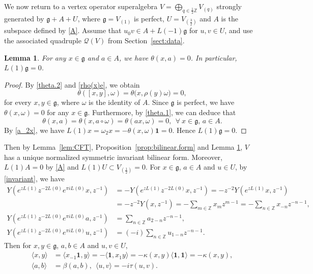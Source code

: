 \documentclass[12pt]{article}
\numberwithin{equation}{section}
\newtheorem{lemma}[theorem]{Lemma}
\theoremstyle{definition}
\theoremstyle{plain}
\newcommand{\bZ}{\ensuremath{\mathbb{Z}}}
\newcommand{\fg}{\mathfrak{g}}
\newcommand{\cQ}{\ensuremath{\mathcal{Q}}}
\newcommand{\bone}{\mathbf{1 }}
\begin{document}
We now return to a vertex operator superalgebra $V=\bigoplus_{q\in\frac{1}{2}\bZ}V_{(q)}$ strongly generated by $\fg+A+U$, where $\fg=V_{(1)}$ is perfect, $U=V_{(\frac32)}$ and $A$ is the subspace defined by \eqref{A}. Assume that $u_0v\in A+L(-1)\fg$ for $u,v\in U$, and use the associated quadruple $\cQ(V)$ from Section~\ref{sect:data}. 
\begin{lemma}\label{lem:L(1)g=0}
    For any $x\in\fg$ and $a\in A$, we have $\theta(x,a)=0$. In particular, $L(1)\fg=0$.
\end{lemma}
\begin{proof}
    By \eqref{theta.2} and \eqref{rho(x)e}, we obtain
    \begin{equation*}
        \theta([x,y],\omega)=\theta\big(x,\rho(y)\omega\big)=0,
    \end{equation*}
    for every $x,y\in\fg$, where $\omega$ is the identity of $A$. Since $\fg$ is perfect, we have $\theta(x,\omega)=0$ for any $x\in\fg$. Furthermore, by \eqref{theta.1}, we can deduce that
    \begin{equation*}
        \theta(x,a)=\theta(x,a\circ \omega)=\theta(ax,\omega)=0,\ \ \forall\ x\in\fg,\,a\in A.
    \end{equation*}
    By \eqref{a_2x}, we have $L(1)x=\omega_2x=-\theta(x,\omega)\bone=0$. Hence $L(1)\fg=0$.
\end{proof}
Then by Lemma~\ref{lem:CFT}, Proposition~\ref{prop:bilinear.form} and Lemma \ref{lem:L(1)g=0}, $V$ has a unique normalized symmetric invariant bilinear form. Moreover, $L(1)A=0$ by \eqref{A} and $L(1)U\subset V_{(\frac12)}=0$. For $x\in\fg$, $a\in A$ and $u\in U$, by \eqref{invariant}, we have
\begin{align*}
    Y(e^{zL(1)}z^{-2L(0)}e^{\pi iL(0)}x,z^{-1})&=-Y(e^{zL(1)}z^{-2L(0)}x,z^{-1})=-z^{-2}Y(e^{zL(1)}x,z^{-1})\\
    &=-z^{-2}Y(x,z^{-1})=-\sum_{m\in\bZ}x_mz^{m-1}=-\sum_{n\in\bZ}x_{-n}z^{-n-1},\\
    Y(e^{zL(1)}z^{-2L(0)}e^{\pi iL(0)}a,z^{-1})&=\sum_{n\in\bZ}a_{2-n}z^{-n-1},\\
    Y(e^{zL(1)}z^{-2L(0)}e^{\pi iL(0)}u,z^{-1})&=(-i)\sum_{n\in\bZ}u_{1-n}z^{-n-1}.
\end{align*}
Then for $x,y\in\fg$, $a,b\in A$ and $u,v\in U$,
\begin{align*}
    \langle x,y\rangle&=\langle x_{-1}\bone,y\rangle=-\langle \bone,x_1y\rangle=-\kappa(x,y)\langle\bone,\bone\rangle=-\kappa(x,y),\\
    \langle a,b\rangle&=\beta(a,b),\ \ \langle u,v\rangle=-i\tau(u,v).
\end{align*}
\end{document}
